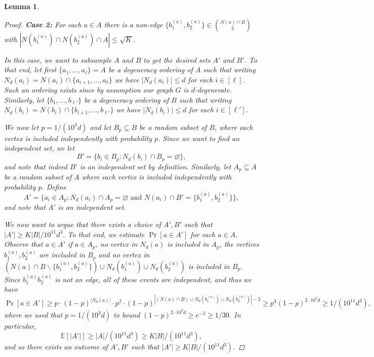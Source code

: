 \documentclass[10pt, a4paper]{article}
\numberwithin{theorem}{section} %
\newtheorem{lemma}[theorem]{Lemma}
\theoremstyle{remark}
\theoremstyle{definition}
\begin{document}
\begin{lemma}
\begin{proof}
        \medskip
        \noindent
        \textbf{Case 2:} For each $a \in A$ there is a non-edge $\{b_1^{(a)}, b_2^{(a)}\} \in \binom{N(a) \cap B}{2}$ with $|N(b_1^{(a)}) \cap N(b_2^{(a)}) \cap A| \leq \sqrt{K}$.

        In this case, we want to subsample $A$ and $B$ to get the desired sets $A'$ and $B'$.
        To that end, let first $\{a_1, \dots, a_{\ell}\} = A$ be a degeneracy ordering of $A$ such that writing $N_d(a_i) = N(a_i)\cap \{a_{i+1}, \dots, a_\ell\}$ we have $|N_d(a_i)| \leq d$ for each $i \in [\ell]$.
        Such an ordering exists since by assumption our graph $G$ is $d$-degenerate.
        Similarly, let $\{b_1, \dots, b_{\ell'}\}$ be a degeneracy ordering of $B$ such that writing $N_d(b_i) = N(b_i)\cap \{b_{i+1}, \dots,  b_{\ell'}\}$ we have $|N_d(b_i)| \leq d$ for each $i \in [\ell']$.

        We now let $p = 1/(10^3d)$ and let $B_p \subseteq B$
        be a random subset of $B$, where each vertex is included independently with probability $p$.
        Since we want to find an independent set, we let
        \[
            B' = \{b_i \in B_p: N_d(b_i) \cap B_p = \varnothing\},
        \]
        and note that indeed $B'$ is an independent set by definition.
        Similarly, let $A_p \subseteq A$ be a random subset of $A$ where each vertex is included independently with probability $p$.
        Define
        \[
            A' = \{a_i \in A_p: N_d(a_i) \cap A_p = \varnothing \text{ and } N(a_i) \cap B' = \{b_1^{(a)}, b_2^{(a)}\}\},
        \]
        and note that $A'$ is an independent set.

        We now want to argue that there exists a choice of $A', B'$ such that $|A'| \geq K|B|/10^{11}d^3$. 
        To that end, we estimate $\Pr[a\in A']$ for each $a \in A$. Observe that $a \in A'$ if $a \in A_p$, no vertex in $N_d(a)$ is included in $A_p$, the vertices $b_1^{(a)}, b_2^{(a)}$ are included in $B_p$ and no vertex in $(N(a) \cap B\backslash\{b_1^{(a)}, b_2^{(a)}\}) \cup N_d(b_1^{(a)})\cup N_d(b_2^{(a)})$ is included in $B_p$. Since $b_1^{(a)}b_2^{(a)}$ is not an edge, all of these events are independent, and thus we have 
        \[
            \Pr[a \in A'] \geq p \cdot(1-p)^{|N_d(a)|} \cdot p^2 \cdot (1-p)^{|(N(a) \cap B) \cup N_d(b_1^{(a)})\cup N_d(b_2^{(a)})|-2}\geq p^3(1-p)^{2\cdot 10^3d} \geq 1/(10^{11}d^3),
	        \]
	        where we used that $p = 1/(10^3d)$ to bound $(1-p)^{2\cdot 10^3d}\geq e^{-3}\geq 1/30$.
        In particular, 
        \[
            \mathbb{E}[|A'|] \geq |A| /(10^{11}d^3) \geq K|B|/(10^{11}d^3),
        \]
        and so there exists an outcome of $A', B'$ such that $|A'| \geq K|B|/(10^{11}d^3)$.


\end{proof}
\end{lemma}
\end{document}

